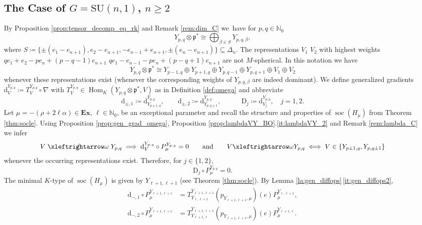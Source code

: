 \documentclass[JEP,XML,SOM,NoFloatCountersInSection,Unicode,published]{cedram}
\theoremstyle{definition}
\newcommand{\lraomega}{\ensuremath{\xleftrightarrow\omega}}
\newcommand{\notleftrightomega}{\mathrel{\ooalign{$\xleftrightarrow\omega$\cr\hidewidth$/$\hidewidth}}}
\newcommand{\mf}[1]{\ensuremath{\mathfrak{#1}}}
\newcommand{\on}[1]{\ensuremath{\operatorname{#1}}}
\newcommand{\Hom}[3]{\ensuremath{\on{Hom}_{#1}(#2,#3)}}
\newcommand{\rhoa}{\ensuremath{\rho}}
\newcommand{\N}{\ensuremath{\mathbb{N}}}
\newcommand{\pst}[1]{\ensuremath{H_{#1}}}
\newcommand{\GSU}[1]{\ensuremath{\mathrm{SU}(#1,1)}}
\begin{document}
\subsection{\texorpdfstring{The Case of $G=\GSU{n}$, $n\geq 2$}{The Case of G=SU(n,1), n>=2}}
By Proposition \ref{prop:tensor_decomp_eq_rk} and Remark \ref{rem:dim_C} we~have for $p,q\in\N_0$
\[
Y_{p,q}\otimes\mf p^*\cong\bigoplus_{\beta\in S}Y_{p,q,\beta},
\]
where $S\coloneqq\{\pm(e_1-e_{n+1}),e_2-e_{n+1},-e_{n-1}+e_{n+1},\pm(e_n-e_{n+1})\}\subseteq\Delta_n$. The representations $V_1$ \resp $V_2$ with highest weights $qe_1+e_2-pe_n+(p-q-1)e_{n+1}$ \resp $qe_1-e_{n-1}-pe_n+(p-q+1)e_{n+1}$ are not $M$-spherical. In this notation we have
\[
Y_{p,q}\otimes\mf p^*\cong Y_{p-1,q}\oplus Y_{p+1,q}\oplus Y_{p,q-1}\oplus Y_{p,q+1}\oplus V_1\oplus V_2
\]
whenever these representations exist (\ie whenever the corresponding weights of $Y_{p,q,\beta}$ are indeed dominant). We define generalized gradients $\mathrm{d}_V^{Y_{p,q}}\coloneqq T_V^{Y_{p,q}}\circ\nabla$ with $T_V^{Y_{p,q}}\in\Hom{K}{Y_{p,q}\otimes\mf p^*}{V}$ as in Definition \ref{def:omega} and abbreviate
\[
\mathrm{d}_{\pm,1}\coloneqq\mathrm{d}_{Y_{p\pm1,q}}^{Y_{p,q}},\qquad\mathrm{d}_{\pm,2}\coloneqq\mathrm{d}_{Y_{p,q\pm1}}^{Y_{p,q}},\qquad\quad\mathrm{D}_j\coloneqq\mathrm{d}_{V_j}^{Y_{p,q}},\quad j=1,2.
\]
Let $\mu=-(\rhoa+2\ell\alpha)\in\mathbf{Ex}$, $\ell\in\N_0$, be an exceptional parameter and recall the structure and properties of $\on{soc}(\pst{\mu})$ from Theorem \ref{thm:socle}. Using Proposition \ref{prop:gen_grad_omega}, Proposition \ref{prop:lambdaVY_BO}.\ref{it:lambdaVY_2} and Remark \ref{rem:lambda_C} we infer\vspace*{-3pt}
\[
V\notleftrightomega Y_{p,q}\implies\mathrm{d}_V^{Y_{p,q}}\circ P_\mu^{Y_{p,q}}=0\qquad\text{and}\qquad V\lraomega Y_{p,q}\iff V\in\{Y_{p\pm1,q}, Y_{p,q\pm1}\}
\]
whenever the occurring representations exist. Therefore, for $j\in\{1,2\}$,\vspace*{-3pt}
\begin{equation}\label{eq:D_j_SUn}
\mathrm{D}_j\circ P_\mu^{Y_{p,q}}=0.
\end{equation}
The minimal $K$-type of $\on{soc}(\pst{\mu})$ is given by $Y_{\ell+1,\ell+1}$ (see Theorem \ref{thm:socle}). By Lemma \ref{la:gen_diffops}\,\eqref{it:gen_diffops2},\vspace*{-3pt}
\begin{align*}
\mathrm{d}_{-,1}\circ P_\mu^{Y_{\ell+1,\ell+1}}&=T_{Y_{\ell,\ell+1}}^{Y_{\ell+1,\ell+1}}(p_{Y_{\ell+1,\ell+1},\mu})(e)P_\mu^{Y_{\ell,\ell+1}},\\
\mathrm{d}_{-,2}\circ P_\mu^{Y_{\ell+1,\ell+1}}&=T_{Y_{\ell+1,\ell}}^{Y_{\ell+1,\ell+1}}(p_{Y_{\ell+1,\ell+1},\mu})(e)P_\mu^{Y_{\ell+1,\ell}}.
\end{align*}
\end{document}
